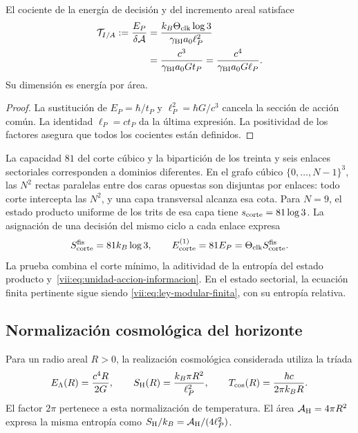 \begin{proposition}
\label{vii:prop:tension-informacion-area}
El cociente de la energía de decisión y del incremento areal satisface
\begin{equation}
 \begin{aligned}
 \mathcal T_{I/A}:=\frac{E_P}{\delta\mathcal A}
 &=\frac{k_B\Theta_{\rm clk}\log3}{\gamma_{\rm BI}a_0\ell_P^2}\\
 &=\frac{c^3}{\gamma_{\rm BI}a_0G t_P}
  =\frac{c^4}{\gamma_{\rm BI}a_0G\ell_P}.
 \end{aligned}
 \label{vii:eq:tension-informacion-area}
\end{equation}
Su dimensión es energía por área.
\end{proposition}
\begin{proof}
La sustitución de \(E_P=\hbar/t_P\) y
\(\ell_P^2=\hbar G/c^3\) cancela la sección de acción común.
La identidad \(\ell_P=ct_P\) da la última expresión. La positividad
de los factores asegura que todos los cocientes están definidos.
\end{proof}

La capacidad \(81\) del corte cúbico y la bipartición de los treinta y
seis enlaces sectoriales corresponden a dominios diferentes. En el
grafo cúbico \(\{0,\ldots,N-1\}^3\), las \(N^2\) rectas
paralelas entre dos caras opuestas son disjuntas por enlaces: todo corte
intercepta las \(N^2\), y una capa transversal alcanza esa cota.
Para \(N=9\), el estado producto uniforme de los trits de esa capa
tiene \(s_{\rm corte}=81\log3\). La asignación de una decisión del
mismo ciclo a cada enlace expresa
\begin{equation}
 S_{\rm corte}^{\rm fis}=81k_B\log3,\qquad
 E_{\rm corte}^{(1)}=81E_P
                  =\Theta_{\rm clk}S_{\rm corte}^{\rm fis}.
 \label{vii:eq:corte-energia-informacion}
\end{equation}
La prueba combina el corte mínimo, la aditividad de la entropía del
estado producto y~\eqref{vii:eq:unidad-accion-informacion}. En el estado
sectorial, la ecuación finita pertinente sigue siendo
\eqref{vii:eq:ley-modular-finita}, con su entropía relativa.

\subsection{Normalización cosmológica del horizonte}
\label{vii:subsec:balance-horizonte}

Para un radio areal \(R>0\), la realización cosmológica considerada
utiliza la tríada
\begin{equation}
 E_\Lambda(R)=\frac{c^4R}{2G},\qquad
 S_{\rm H}(R)=\frac{k_B\pi R^2}{\ell_P^2},\qquad
 T_{\rm cos}(R)=\frac{\hbar c}{2\pi k_BR}.
 \label{vii:eq:horizonte-cosmologico}
\end{equation}
El factor \(2\pi\) pertenece a esta normalización de temperatura.
El área \(\mathcal A_{\rm H}=4\pi R^2\) expresa la misma entropía
como \(S_{\rm H}/k_B=\mathcal A_{\rm H}/(4\ell_P^2)\).

